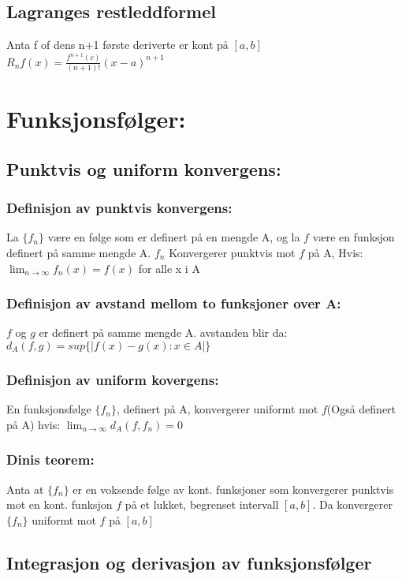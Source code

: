 \documentclass[8pt,a4paper,twocolumn,twoside]{article}
\def\abs#1{|#1|}
\begin{document}
        \subsection*{Lagranges restleddformel}
        Anta f of dens n+1 første deriverte er kont på $[a,b]$\\
        $R_nf(x) = \frac{f^{n+1}(c)}{(n+1)!}(x-a)^{n+1}$
    \section*{Funksjonsfølger:}
        \subsection*{Punktvis og uniform konvergens:}
            \subsubsection*{Definisjon av punktvis konvergens:}
            La $\{f_n\}$ være en følge som er definert på en mengde A, og la $f$ være en funksjon definert på 
            samme mengde A. ${f_n}$ Konvergerer punktvis mot $f$ på A, Hvis:
            $\lim_{n\to\infty}f_n(x)=f(x)$ for alle x i A
            \subsubsection*{Definisjon av avstand mellom to funksjoner over A:}
            $f$ og $g$ er definert på samme mengde A. avstanden blir da:
            $d_A(f,g) = sup\{\abs{f(x)-g(x):x\in A}\}$
            \subsubsection*{Definisjon av uniform kovergens:}
            En funksjonsfølge $\{f_n\}$, definert på A, konvergerer uniformt mot $f$(Også definert på A) hvis:
            $\lim_{n\to\infty}d_A(f,f_n) = 0$
            \subsubsection*{Dinis teorem:}
            Anta at $\{f_n\}$ er en voksende følge av kont. funksjoner som konvergerer punktvis mot en kont.
            funksjon $f$ på et lukket, begrenset intervall $[a,b]$. Da konvergerer $\{f_n\}$ uniformt mot $f$ på $[a,b]$
        \subsection*{Integrasjon og derivasjon av funksjonsfølger}
\end{document}
